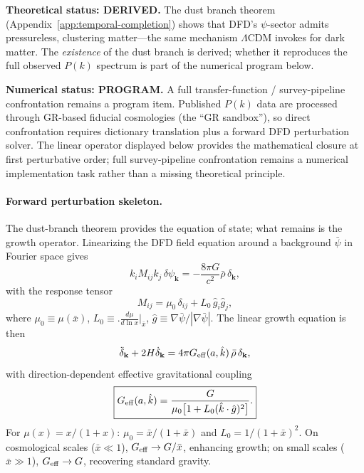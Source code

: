 \textbf{Theoretical status: DERIVED.} The dust branch theorem (Appendix~\ref{app:temporal-completion}) shows that DFD's $\psi$-sector admits pressureless, clustering matter---the same mechanism $\Lambda$CDM invokes for dark matter.  The \emph{existence} of the dust branch is derived; whether it reproduces the full observed $P(k)$ spectrum is part of the numerical program below.

\textbf{Numerical status: PROGRAM.} A full transfer-function / survey-pipeline confrontation remains a program item. Published $P(k)$ data are processed through GR-based fiducial cosmologies (the ``GR sandbox''), so direct confrontation requires dictionary translation plus a forward DFD perturbation solver.  The linear operator displayed below provides the mathematical closure at first perturbative order; full survey-pipeline confrontation remains a numerical implementation task rather than a missing theoretical principle.

\paragraph{Forward perturbation skeleton.}
The dust-branch theorem provides the equation of state; what remains is the growth operator.  Linearizing the DFD field equation around a background $\bar\psi$ in Fourier space gives
\begin{equation}\label{eq:perturb-fourier}
k_i M_{ij} k_j\,\delta\psi_{\mathbf{k}} = -\frac{8\pi G}{c^2}\bar\rho\,\delta_{\mathbf{k}},
\end{equation}
with the response tensor
\begin{equation}\label{eq:M-tensor}
M_{ij} = \mu_0\,\delta_{ij} + L_0\,\hat{g}_i\hat{g}_j,
\end{equation}
where
$\mu_0 \equiv \mu(\bar{x})$,\;
$L_0 \equiv \bigl.\frac{d\mu}{d\ln x}\bigr|_{\bar{x}}$,\;
$\hat{g} \equiv \nabla\bar\psi/|\nabla\bar\psi|$.
The linear growth equation is then
\begin{equation}\label{eq:growth-Geff}
\ddot\delta_{\mathbf{k}} + 2H\dot\delta_{\mathbf{k}} = 4\pi G_{\rm eff}(a,\hat{k})\,\bar\rho\,\delta_{\mathbf{k}},
\end{equation}
with direction-dependent effective gravitational coupling
\begin{equation}\label{eq:G-eff}
\boxed{G_{\rm eff}(a,\hat{k}) = \frac{G}{\mu_0\big[1 + L_0(\hat{k}\cdot\hat{g})^2\big]}.}
\end{equation}
For $\mu(x)=x/(1+x)$: $\mu_0 = \bar{x}/(1+\bar{x})$ and $L_0 = 1/(1+\bar{x})^2$.  On cosmological scales ($\bar{x} \ll 1$), $G_{\rm eff} \to G/\bar{x}$, enhancing growth; on small scales ($\bar{x} \gg 1$), $G_{\rm eff} \to G$, recovering standard gravity.

